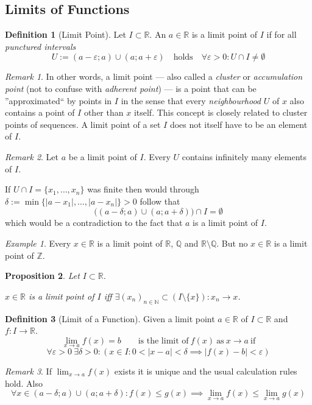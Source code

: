 \documentclass[english,titlepage]{uzhpub}
\theoremstyle{definition}
\newtheorem{definition}{Definition}[section]
\theoremstyle{plain}
\newtheorem{proposition}[definition]{Proposition}
\theoremstyle{remark}
\newtheorem*{remark}{Remark}
\theoremstyle{example}
\newtheorem*{example}{Example}
\begin{document}
   \subsection{Limits of Functions}
   \begin{definition}[Limit Point]
      Let \(I \subset \mathbb{R}\).
      An \(a \in \mathbb{R}\) is a limit point of \(I\) if for all \textit{punctured intervals}
      \[U := (a-\varepsilon; a) \cup (a; a+\varepsilon) \quad\text{holds}\quad \forall \varepsilon > 0: U \cap I \neq \emptyset\]
   \end{definition}
   \begin{remark}
      In other words, a limit point --- also called a \textit{cluster} or \textit{accumulation point} (not to confuse with \textit{adherent point}) --- is a point that can be ''approximated`` by points in \(I\) in the sense that every \textit{neighbourhood} \(U\) of \(x\) also contains a point of \(I\) other than \(x\) itself.
      This concept is closely related to cluster points of sequences.
      A limit point of a set \(I\) does not itself have to be an element of \(I\).
   \end{remark}
   \begin{remark}
      Let \(a\) be a limit point of \(I\).
      Every \(U\) contains infinitely many elements of \(I\).

      If \(U \cap I = \{x_1, \ldots, x_n\}\) was finite then would through \(\delta := \min\{|a - x_1|, \ldots, |a - x_n|\} > 0\) follow that
      \[\big((a-\delta;a) \cup (a;a+\delta)\big) \cap I = \emptyset\]
      which would be a contradiction to the fact that \(a\) is a limit point of \(I\).
   \end{remark}
   \begin{example}
      Every \(x \in \mathbb{R}\) is a limit point of \(\mathbb{R}\), \(\mathbb{Q}\) and \(\mathbb{R}\setminus\mathbb{Q}\).
      But no \(x \in \mathbb{R}\) is a limit point of \(\mathbb{Z}\).
   \end{example}

   \begin{proposition}\label{pro:limit_point_convergent_seq}
      Let \(I \subset \mathbb{R}\).

      \(x \in \mathbb{R}\) is a limit point of \(I\) iff \(\exists (x_n)_{n \in \mathbb{N}} \subset (I \setminus \{x\}): x_n \to x\).
   \end{proposition}

   \begin{definition}[Limit of a Function]
      Given a limit point \(a \in \mathbb{R}\) of \(I \subset \mathbb{R}\) and \(f: I \to \mathbb{R}\).
      \[\lim_{x \to a} f(x) = b \qquad\text{is the limit of}~f(x)~\text{as}~x \to a~\text{if}\]
      \[\forall \varepsilon > 0~\exists \delta > 0: (x \in I: 0 < |x-a| < \delta \implies |f(x) - b| < \varepsilon)\]
   \end{definition}
   \begin{remark}
      If \(\lim_{x \to a} f(x)\) exists it is unique and the usual calculation rules hold.
      Also
      \[\forall x \in (a - \delta; a) \cup (a; a + \delta): f(x) \leq g(x) \implies \lim_{x \to a} f(x) \leq \lim_{x \to a} g(x)\]
   \end{remark}
\end{document}
